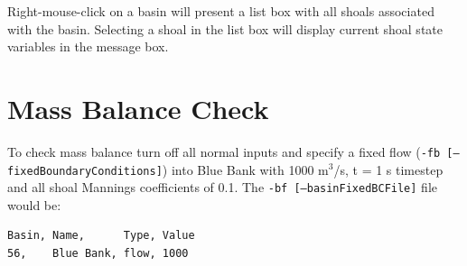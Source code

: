 \begin{minipage}[t]{0.25\textwidth}
  \centering{}
\end{minipage}\hfill
\begin{minipage}[t]{0.7\textwidth}
Right-mouse-click on a basin will present a list box with all shoals associated with the basin. Selecting a shoal in the list box will display current shoal state variables in the message box. 
\end{minipage}

\clearpage 
\section{Mass Balance Check}
\label{sec:Mass Balance Check}
To check mass balance turn off all normal inputs and specify a fixed flow \newline (\texttt{-fb [--fixedBoundaryConditions]}) into Blue Bank with 1000 $\mathrm{m}^3$/s, t = 1 s timestep and all shoal Mannings coefficients of 0.1.  The \texttt{-bf [--basinFixedBCFile]} file would be:

\small
\begin{verbatim}
Basin, Name,      Type, Value
56,    Blue Bank, flow, 1000
\end{verbatim}
\large

